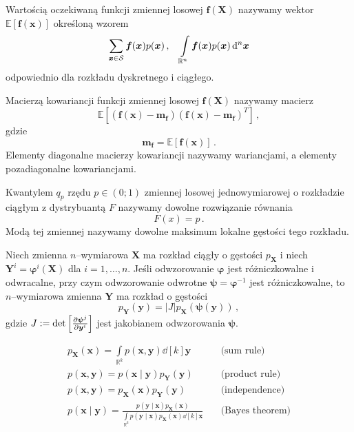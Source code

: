 \documentclass{myclass}
\numberwithin{equation}{subsection}
\begin{document}
\begin{definition}
Wartością oczekiwaną funkcji zmiennej losowej \(\bm{f}(\bm{X})\) nazywamy wektor
\(\mathbb{E}[\bm{f}(\bm{x})]\) określoną wzorem
\[
 \sum_{\bm{x} \in \mathcal{S}} \bm{f}(\bm{x}) p(\bm{x})\,,\quad \int\limits_{\mathbb{R}^n} \bm{f}(\bm{x}) p(\bm{x}) \dd[n]{\bm{x}}
\]
odpowiednio dla rozkładu dyskretnego i ciągłego.
\end{definition}

\begin{definition}
Macierzą kowariancji funkcji zmiennej losowej \(\bm{f}(\bm{X})\) nazywamy macierz
\[
\mathbb{E}\left[(\bm{f}(\bm{x}) - \bm{m_f})(\bm{f}(\bm{x}) - \bm{m_f})^T\right]\,,
\]
gdzie
\[
\bm{m_f} = \mathbb{E}\left[\bm{f}(\bm{x})\right]\,.
\]
Elementy diagonalne macierzy kowariancji nazywamy wariancjami, a elementy pozadiagonalne
kowariancjami.
\end{definition}

\begin{definition}
Kwantylem \(q_p\) rzędu \(p \in (0;1)\) zmiennej losowej jednowymiarowej o rozkładzie ciągłym z
dystrybuantą \(F\) nazywamy dowolne rozwiązanie równania
\[
F(x) = p\,.
\]
Modą tej zmiennej nazywamy dowolne maksimum lokalne gęstości tego rozkładu.
\end{definition}

\begin{theorem}
Niech zmienna \(n\)--wymiarowa \(\bm{X}\) ma rozkład ciągły o gęstości \(p_{\bm{X}}\) i niech
\(\bm{Y}^i = \bm{\varphi}^i(\bm{X})\) dla \(i=1,\ldots,n\). Jeśli odwzorowanie \(\bm{\varphi}\) jest
różniczkowalne i odwracalne, przy czym odwzorowanie odwrotne \(\bm{\psi} = \bm{\varphi}^{-1}\) jest
różniczkowalne, to \(n\)--wymiarowa zmienna \(\bm{Y}\) ma rozkład o gęstości
\[
p_{\bm{Y}}(\bm{y}) = |J| p_{\bm{X}}(\bm{\psi}(\bm{y}))\,,
\]
gdzie \(J := \det \left[\pdv{\bm{\psi}^j}{\bm{y}^i}\right]\) jest jakobianem odwzorowania
\(\bm{\psi}\).
\end{theorem}

\begin{theorem}
\[
\begin{split}    
p_{\bm{X}} (\bm{x}) = \int\limits_{\mathbb{R}^k} p(\bm{x}, \bm{y}) \dd[k]{\bm{y}}\quad&\text{(sum rule)}\\
p(\bm{x}, \bm{y}) = p(\bm{x} \mid \bm{y}) p_{\bm{Y}}(\bm{y})\quad&\text{(product rule)}\\
p(\bm{x}, \bm{y}) = p_{\bm{X}}(\bm{x}) p_{\bm{Y}}(\bm{y})\quad&\text{(independence)}\\
p(\bm{x} \mid \bm{y}) = \frac{p(\bm{y} \mid \bm{x}) p_{\bm{X}}(\bm{x})}{ \int\limits_{\mathbb{R}^k} p(\bm{y} \mid \bm{x}) p_{\bm{X}}(\bm{x}) \dd[k]{\bm{x}} }\quad&\text{(Bayes theorem)}
\end{split}
\]
\end{theorem}
\end{document}
